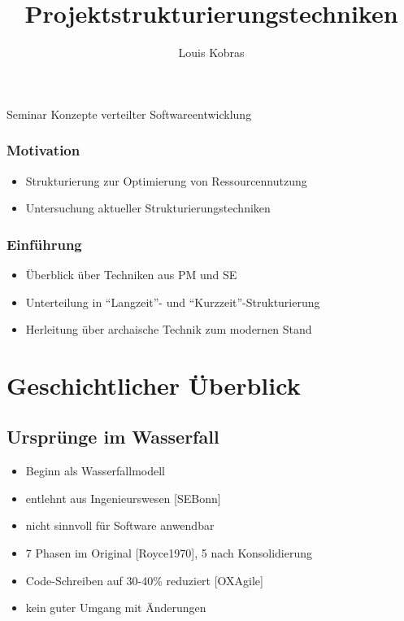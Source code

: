 \documentclass[%
	handout
]{beamer}
\author{Louis Kobras}
\title{Projektstrukturierungstechniken}
\newcommand{\sewiki}{[SEBonn]}
\newcommand{\waterfall}{[Royce1970]}
\newcommand{\waterfallmodel}{[OXAgile]}
\begin{document}
\begin{frame}
	\maketitle
	\vspace{-0.2cm}
	\begin{center}
		Seminar Konzepte verteilter Softwareentwicklung
	\end{center}
\end{frame}

\begin{frame}
	\frametitle{Motivation}
	\begin{itemize}
		\item Strukturierung zur Optimierung von Ressourcennutzung
		\item Untersuchung aktueller Strukturierungstechniken
	\end{itemize}
\end{frame}

\begin{frame}
	\frametitle{Einführung}
	\begin{itemize}
		\item Überblick über Techniken aus PM und SE
		\item Unterteilung in ``Langzeit''- und ``Kurzzeit''-Strukturierung
		\item Herleitung über archaische Technik zum modernen Stand
	\end{itemize}
\end{frame}

\begin{frame}
	\tableofcontents
\end{frame}

\section{Geschichtlicher Überblick}
	\subsection{Ursprünge im Wasserfall}
		\begin{frame}
			\begin{itemize}
				\item Beginn als Wasserfallmodell\pause
				\item entlehnt aus Ingenieurswesen \sewiki\pause
				\item nicht sinnvoll für Software anwendbar\pause
			\end{itemize}
			\pause
			\begin{itemize}
				\item 7 Phasen im Original \waterfall\pause, 5 nach Konsolidierung\pause
				\item Code-Schreiben auf 30-40\% reduziert \waterfallmodel\pause
				\item kein guter Umgang mit Änderungen
			\end{itemize}
		\end{frame}
		
\end{document}
